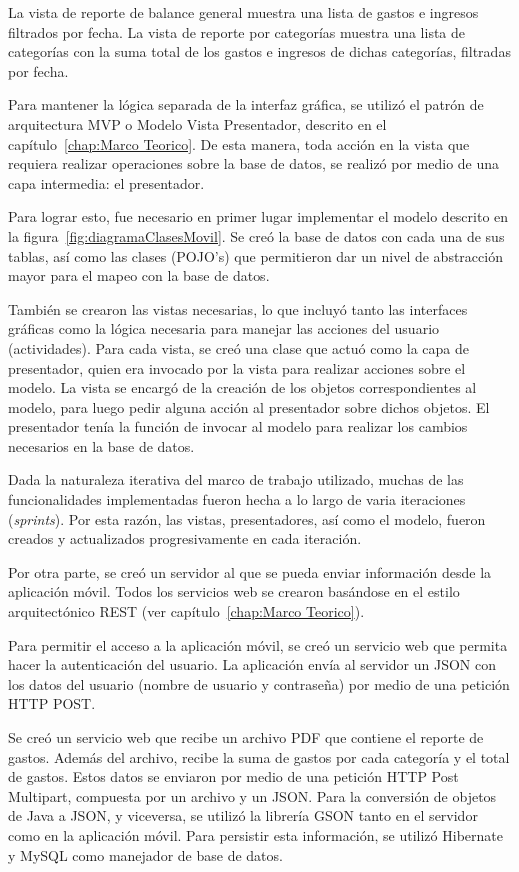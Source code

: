 La vista de reporte de balance general muestra una lista de gastos e ingresos filtrados por fecha. La vista de reporte por categorías muestra una lista de categorías con la suma total de los gastos e ingresos de dichas categorías, filtradas por fecha.



Para mantener la lógica separada de la interfaz gráfica, se utilizó el patrón de arquitectura MVP o Modelo Vista Presentador, descrito en el capítulo~\ref{chap:Marco Teorico}. De esta manera, toda acción en la vista que requiera realizar operaciones sobre la base de datos, se realizó por medio de una capa intermedia: el presentador. 

Para lograr esto, fue necesario en primer lugar implementar el modelo descrito en la figura~\ref{fig:diagramaClasesMovil}. Se creó la base de datos con cada una de sus tablas, así como las clases (POJO's) que permitieron dar un nivel de abstracción mayor para el mapeo con la base de datos.

También se crearon las vistas necesarias, lo que incluyó tanto las interfaces gráficas como la lógica necesaria para manejar las acciones del usuario (actividades). Para cada vista, se creó una clase que actuó como la capa de presentador, quien era invocado por la vista para realizar acciones sobre el modelo. La vista se encargó de la creación de los objetos correspondientes al modelo, para luego pedir alguna acción al presentador sobre dichos objetos. El presentador tenía la función de invocar al modelo para realizar los cambios necesarios en la base de datos.

Dada la naturaleza iterativa del marco de trabajo utilizado, muchas de las funcionalidades implementadas fueron hecha a lo largo de varia iteraciones (\textit{sprints}). Por esta razón, las vistas, presentadores, así como el modelo, fueron creados y actualizados progresivamente en cada iteración.

Por otra parte, se creó un servidor al que se pueda enviar información desde la aplicación móvil. Todos los servicios web se crearon basándose en el estilo arquitectónico REST (ver capítulo~\ref{chap:Marco Teorico}).

Para permitir el acceso a la aplicación móvil, se creó un servicio web que permita hacer la autenticación del usuario. La aplicación envía al servidor un JSON con los datos del usuario (nombre de usuario y contraseña) por medio de una petición HTTP POST.

Se creó un servicio web que recibe un archivo PDF que contiene el reporte de gastos. Además del archivo, recibe la suma de gastos por cada categoría y el total de gastos. Estos datos se enviaron por medio de una petición HTTP Post Multipart, compuesta por un archivo y un JSON. Para la conversión de objetos de Java a JSON, y viceversa, se utilizó la librería GSON tanto en el servidor como en la aplicación móvil. Para persistir esta información, se utilizó Hibernate y MySQL como manejador de base de datos.

